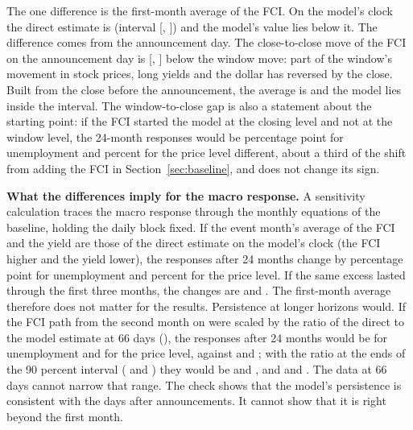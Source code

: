 \documentclass[11pt]{article}
\begin{document}
\begin{appendices}
The one difference is the first-month average of the FCI. On the model's clock the direct estimate is  (interval [, ]) and the model's value  lies below it. The difference comes from the announcement day. The close-to-close move of the FCI on the announcement day is  [, ] below the window move: part of the window's movement in stock prices, long yields and the dollar has reversed by the close. Built from the close before the announcement, the average is  and the model lies inside the interval. The window-to-close gap is also a statement about the starting point: if the FCI started the model at the closing level and not at the window level, the 24-month responses would be  percentage point for unemployment and  percent for the price level different, about a third of the shift from adding the FCI in Section~\ref{sec:baseline}, and does not change its sign.

\textbf{What the differences imply for the macro response.} A sensitivity calculation traces the macro response through the monthly equations of the baseline, holding the daily block fixed. If the event month's average of the FCI and the yield are those of the direct estimate on the model's clock (the FCI  higher and the yield  lower), the responses after 24 months change by  percentage point for unemployment and  percent for the price level. If the same excess lasted through the first three months, the changes are  and . The first-month average therefore does not matter for the results. Persistence at longer horizons would. If the FCI path from the second month on were scaled by the ratio of the direct to the model estimate at 66 days (), the responses after 24 months would be  for unemployment and  for the price level, against  and ; with the ratio at the ends of the 90 percent interval ( and ) they would be  and , and  and . The data at 66 days cannot narrow that range. The check shows that the model's persistence is consistent with the days after announcements. It cannot show that it is right beyond the first month.





\end{appendices}
\end{document}
